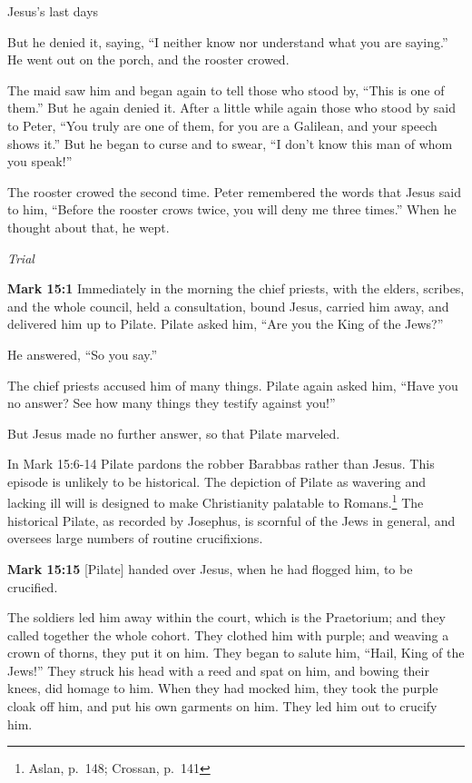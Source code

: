 \documentclass[10pt,twoside]{article} %
\newcommand{\quotesize}{\normalsize{}}
\newcommand{\comm}[1]{\begingroup \color{black!50} #1\endgroup}
\newenvironment{quotetext}{\begingroup\quotesize}{\endgroup}
\newcommand{\bible}[2]{\begin{quotetext}\textbf{#1} #2\end{quotetext}}
\newcommand{\gospelmark}[2]{\bible{Mark #1}{#2}}
\newcommand{\subhead}[1]{\emph{#1}\par}
\begin{document}
\begin{section}{Jesus's last days}
{  But he denied it, saying, ``I neither know nor understand what you are saying.'' He went out on the porch, and the rooster crowed.

  The maid saw him and began again to tell those who stood by, ``This is one of them.''   But he again denied it. After a little while again those who stood by said to Peter, ``You truly are one of them, for you are a Galilean, and your speech shows it.''   But he began to curse and to swear, ``I don't know this man of whom you speak!''

  The rooster crowed the second time. Peter remembered the words that Jesus said to him, ``Before the rooster crows twice, you will deny me three times.'' When he thought about that, he wept. 
}

\subhead{Trial}

\gospelmark{15:1}{
Immediately in the morning the chief priests, with the elders, scribes, and the whole council, held a consultation, bound Jesus, carried him away, and delivered him up to Pilate.   Pilate asked him, ``Are you the King of the Jews?''

He answered, ``So you say.''

  The chief priests accused him of many things.   Pilate again asked him, ``Have you no answer? See how many things they testify against you!''

  But Jesus made no further answer, so that Pilate marveled. 
}

\comm{In Mark 15:6-14 Pilate pardons the robber Barabbas rather than Jesus. This episode is unlikely to be historical.
The depiction of Pilate as wavering and lacking ill will is designed to make Christianity palatable to Romans.\footnote{Aslan, p.~148; Crossan,
p.~141} The historical Pilate, as recorded by Josephus, is scornful of the Jews in general, and oversees large numbers
of routine crucifixions.
}

\gospelmark{15:15}{
[Pilate] handed over Jesus, when he had flogged him, to be crucified.

  The soldiers led him away within the court, which is the Praetorium; and they called together the whole cohort.   They clothed him with purple; and weaving a crown of thorns, they put it on him.   They began to salute him, ``Hail, King of the Jews!''   They struck his head with a reed and spat on him, and bowing their knees, did homage to him.   When they had mocked him, they took the purple cloak off him, and put his own garments on him. They led him out to crucify him.

}
\end{section}
\end{document}
